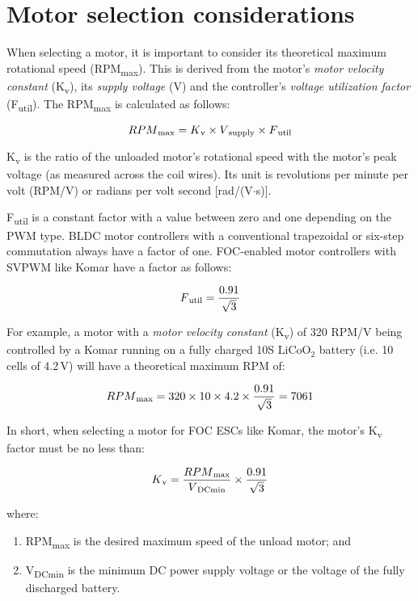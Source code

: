 \chapter{Motor selection considerations}
When selecting a motor, it is important to consider its theoretical maximum rotational speed
(RPM\textsubscript{max}). This is derived from the motor's \emph{motor velocity constant}
(K\textsubscript{v}), its \emph{supply voltage} (V) and the controller's \emph{voltage utilization
factor} (F\textsubscript{util}). The RPM\textsubscript{max} is calculated as follows:

\[RPM\textsubscript{max} = K\textsubscript{v} \times V\textsubscript{supply} \times F\textsubscript{util}\]

K\textsubscript{v} is the ratio of the unloaded motor's rotational speed with the motor's peak
voltage (as measured across the coil wires). Its unit is revolutions per minute per volt (RPM/V)
or radians per volt second [rad/(V$\cdot$s)].

F\textsubscript{util} is a constant factor with a value between zero and one depending on the
PWM type. BLDC motor controllers with a conventional trapezoidal or six-step commutation always
have a factor of one. FOC-enabled motor controllers with SVPWM like Komar have a factor as follows:

\[F\textsubscript{util} = \frac{0.91}{\sqrt{3}}\]

For example, a motor with a \emph{motor velocity constant} (K\textsubscript{v}) of 320 RPM/V being
controlled by a Komar running on a fully charged 10S $\text{LiCoO}_\text{2}$ battery (i.e. 10 cells
of 4.2\,V) will have a theoretical maximum RPM of:

\[RPM\textsubscript{max} = 320 \times 10 \times 4.2 \times \frac{0.91}{\sqrt{3}} = 7061\]

In short, when selecting a motor for FOC ESCs like Komar, the motor's K\textsubscript{v} factor
must be no less than:

\[K\textsubscript{v} = \frac{RPM\textsubscript{max}}{V\textsubscript{DCmin}} \times \frac{0.91}{\sqrt{3}}\]

where:

\begin{enumerate}[label=(\roman*),leftmargin=\leftskip+1em,labelindent=!]
  \item RPM\textsubscript{max} is the desired maximum speed of the unload motor; and
  \item V\textsubscript{DCmin} is the minimum DC power supply voltage or the voltage of the
        fully discharged battery.
\end{enumerate}
